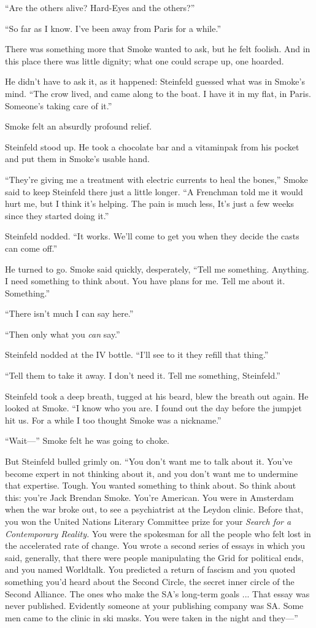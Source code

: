 ``Are the others alive? Hard-Eyes and the others?''

``So far as I know. I've been away from Paris for a while.''

There was something more that Smoke wanted to ask, but he felt foolish. And in this place there was little dignity; what one could scrape up, one hoarded.

He didn't have to ask it, as it happened: Steinfeld guessed what was in Smoke's mind. ``The crow lived, and came along to the boat. I have it in my flat, in Paris. Someone's taking care of it.''

Smoke felt an absurdly profound relief.

Steinfeld stood up. He took a chocolate bar and a vitaminpak from his pocket and put them in Smoke's usable hand.

``They're giving me a treatment with electric currents to heal the bones,'' Smoke said to keep Steinfeld there just a little longer. ``A Frenchman told me it would hurt me, but I think it's helping. The pain is much less, It's just a few weeks since they started doing it.''

Steinfeld nodded. ``It works. We'll come to get you when they decide the casts can come off.''

He turned to go. Smoke said quickly, desperately, ``Tell me something. Anything. I need something to think about. You have plans for me. Tell me about it. Something.''

``There isn't much I can say here.''

``Then only what you \textit{can} say.''

Steinfeld nodded at the IV bottle. ``I'll see to it they refill that thing.''

``Tell them to take it away. I don't need it. Tell me something, Steinfeld.''

Steinfeld took a deep breath, tugged at his beard, blew the breath out again. He looked at Smoke. ``I know who you are. I found out the day before the jumpjet hit us. For a while I too thought Smoke was a nickname.''

``Wait---'' Smoke felt he was going to choke.

But Steinfeld bulled grimly on. ``You don't want me to talk about it. You've become expert in not thinking about it, and you don't want me to undermine that expertise. Tough. You wanted something to think about. So think about this: you're Jack Brendan Smoke. You're American. You were in Amsterdam when the war broke out, to see a psychiatrist at the Leydon clinic. Before that, you won the United Nations Literary Committee prize for your \textit{Search for a Contemporary Reality.} You were the spokesman for all the people who felt lost in the accelerated rate of change. You wrote a second series of essays in which you said, generally, that there were people manipulating the Grid for political ends, and you named Worldtalk. You predicted a return of fascism and you quoted something you'd heard about the Second Circle, the secret inner circle of the Second Alliance. The ones who make the SA's long-term goals ... That essay was never published. Evidently someone at your publishing company was SA. Some men came to the clinic in ski masks. You were taken in the night and they---''

